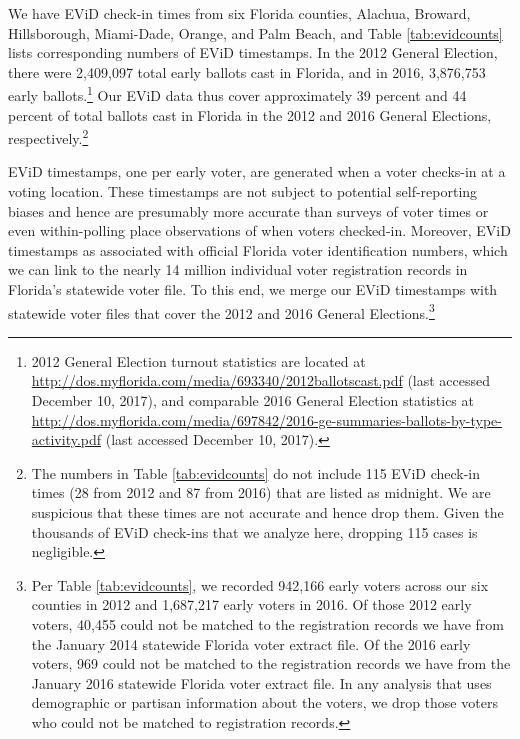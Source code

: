\documentclass[12pt,titlepage]{article}
\begin{document}
We have EViD check-in times from six Florida counties, Alachua,
Broward, Hillsborough, Miami-Dade, Orange, and Palm Beach, and Table
\ref{tab:evidcounts} lists corresponding numbers of EViD timestamps.
In the 2012 General Election, there were 2,409,097 total early ballots
cast in Florida, and in 2016, 3,876,753 early ballots.\footnote{2012
  General Election turnout statistics are located at
  \url{http://dos.myflorida.com/media/693340/2012ballotscast.pdf}
  (last accessed December 10, 2017), and comparable 2016 General
  Election statistics at
  \url{http://dos.myflorida.com/media/697842/2016-ge-summaries-ballots-by-type-activity.pdf}
  (last accessed December 10, 2017).}  Our EViD data thus cover
approximately 39 percent and 44 percent of total ballots cast in
Florida in the 2012 and 2016 General Elections,
respectively.\footnote{The numbers in Table \ref{tab:evidcounts} do
  not include 115 EViD check-in times (28 from 2012 and 87 from 2016)
  that are listed as midnight.  We are suspicious that these times are
  not accurate and hence drop them.  Given the thousands of EViD
  check-ins that we analyze here, dropping 115 cases is
  negligible.\label{fn:midnight}}





EViD timestamps, one per early voter, are generated when a voter
checks-in at a voting location.  These timestamps are not subject to
potential self-reporting biases and hence are presumably more accurate
than surveys of voter times or even within-polling place observations
of when voters checked-in.  Moreover, EViD timestamps as associated
with official Florida voter identification numbers, which we can link
to the nearly 14 million individual voter registration records in
Florida's statewide voter file.  To this end, we merge our EViD
timestamps with statewide voter files that cover the 2012 and 2016
General Elections.\footnote{Per Table \ref{tab:evidcounts}, we
  recorded 942,166 early voters across our six counties in 2012 and
  1,687,217 early voters in 2016.  Of those 2012 early voters, 40,455
  could not be matched to the registration records we have from the
  January 2014 statewide Florida voter extract file.  Of the 2016
  early voters, 969 could not be matched to the registration records
  we have from the January 2016 statewide Florida voter extract file.
  In any analysis that uses demographic or partisan information about
  the voters, we drop those voters who could not be matched to
  registration records.}
\end{document}
